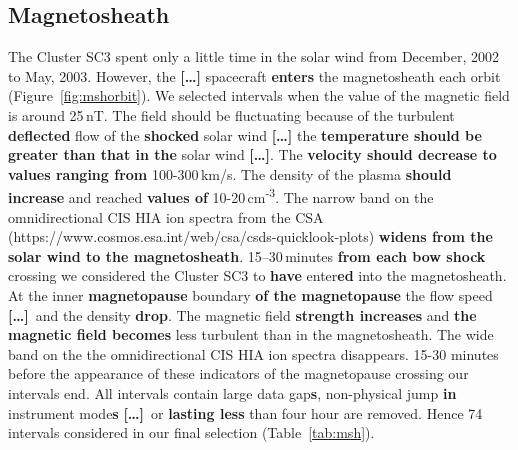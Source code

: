 \documentclass[linenumbers,draft]{agujournal}
\newcommand{\del}{\textbf{[\dots]}\ } %
\begin{document}
\subsection{Magnetosheath}
\label{sec:msh}

The Cluster SC3 spent only a little time in the solar wind from December, 2002 to May, 2003. However, the \textbf{[\dots]} spacecraft \textbf{enters} the magnetosheath  each orbit (Figure~\ref{fig:mshorbit}). We selected intervals when the value of the magnetic field is around 25\,nT. The field should be fluctuating because of the turbulent \textbf{deflected} flow of the \textbf{shocked} solar wind \textbf{[\dots]} the \textbf{temperature should be greater than that in the} solar wind \textbf{[\dots]}. The \textbf{velocity should decrease to values ranging from} 100-300\,km/s. The density of the plasma \textbf{should increase} and reached \textbf{values of} 10-20\,cm\textsuperscript{-3}.  The narrow band on the  omnidirectional CIS HIA ion spectra from the CSA (https://www.cosmos.esa.int/web/csa/csds-quicklook-plots) \textbf{widens from the solar wind to the magnetosheath}. 15--30\,minutes \textbf{from each bow shock} crossing we considered the Cluster SC3 to \textbf{have} enter\textbf{ed} into the magnetosheath. At the inner \textbf{magnetopause} boundary \textbf{of the magnetopause} the flow speed \del and the density \textbf{drop}. The magnetic field \textbf{strength increases} and \textbf{the magnetic field becomes} less turbulent than in the magnetosheath. The wide band on the  the omnidirectional CIS HIA ion spectra disappears. 15-30 minutes before the appearance  of these indicators of the magnetopause crossing our intervals end. All intervals contain large data gap\textbf{s}, non-physical jump \textbf{in} instrument mode\textbf{s} \del or \textbf{lasting less} than four hour are removed. Hence 74 intervals considered in our final selection (Table~\ref{tab:msh}). 
\end{document}

